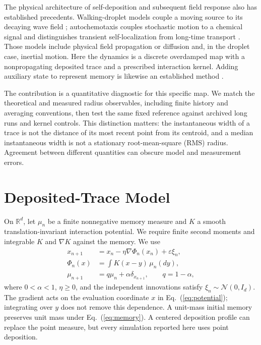 The physical architecture of self-deposition and subsequent field response
also has established precedents. Walking-droplet models couple a moving
source to its decaying wave field \cite{OzaRosalesBush2013}; autochemotaxis
couples stochastic motion to a chemical signal and distinguishes transient
self-localization from long-time transport \cite{Grima2005}.
Those models include physical field propagation or diffusion and, in the
droplet case, inertial motion. Here the dynamics is a discrete overdamped
map with a nonpropagating deposited trace and a prescribed interaction
kernel. Adding auxiliary state to represent memory is likewise an
established method \cite{Mori1965,JaganathanValani2025}.

The contribution is a quantitative diagnostic for this specific map.
We match the theoretical and measured radius observables, including finite
history and averaging conventions, then test the same fixed reference
against archived long runs and kernel controls. This distinction matters:
the instantaneous width of a trace is not the distance of its most recent
point from its centroid, and a median instantaneous width is not a
stationary root-mean-square (RMS) radius. Agreement between different
quantities can obscure model and measurement errors.

\section{Deposited-Trace Model}
On $\mathbb R^d$, let $\mu_n$ be a finite nonnegative memory measure and
$K$ a smooth translation-invariant interaction potential. We require finite
second moments and integrable $K$ and $\nabla K$ against the memory. We use
\begin{align}
x_{n+1}&=x_n-\eta\nabla\Phi_n(x_n)+\varepsilon\xi_n,
\label{eq:trajectory}\\
\Phi_n(x)&=\int K(x-y)\,\mu_n(dy),
\label{eq:potential}\\
\mu_{n+1}&=q\mu_n+\alpha\delta_{x_{n+1}},\qquad q=1-\alpha,
\label{eq:memory}
\end{align}
where $0<\alpha<1$, $\eta\geq0$, and the independent innovations satisfy
$\xi_n\sim\mathcal N(0,I_d)$. The gradient acts on the evaluation coordinate
$x$ in Eq.~(\ref{eq:potential}); integrating over $y$ does not remove this
dependence. A unit-mass initial memory preserves unit mass under
Eq.~(\ref{eq:memory}). A centered deposition profile can replace the point
measure, but every simulation reported here uses point deposition.

